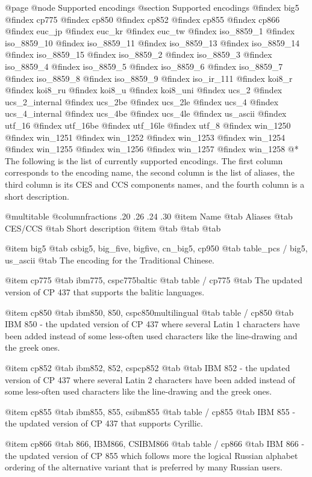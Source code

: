 @page
@node Supported encodings
@section Supported encodings
@findex big5
@findex cp775
@findex cp850
@findex cp852
@findex cp855
@findex cp866
@findex euc_jp
@findex euc_kr
@findex euc_tw
@findex iso_8859_1
@findex iso_8859_10
@findex iso_8859_11
@findex iso_8859_13
@findex iso_8859_14
@findex iso_8859_15
@findex iso_8859_2
@findex iso_8859_3
@findex iso_8859_4
@findex iso_8859_5
@findex iso_8859_6
@findex iso_8859_7
@findex iso_8859_8
@findex iso_8859_9
@findex iso_ir_111
@findex koi8_r
@findex koi8_ru
@findex koi8_u
@findex koi8_uni
@findex ucs_2
@findex ucs_2_internal
@findex ucs_2be
@findex ucs_2le
@findex ucs_4
@findex ucs_4_internal
@findex ucs_4be
@findex ucs_4le
@findex us_ascii
@findex utf_16
@findex utf_16be
@findex utf_16le
@findex utf_8
@findex win_1250
@findex win_1251
@findex win_1252
@findex win_1253
@findex win_1254
@findex win_1255
@findex win_1256
@findex win_1257
@findex win_1258
@*
The following is the list of currently supported encodings. The first column
corresponds to the encoding name, the second column is the list of aliases,
the third column is its CES and CCS components names, and the fourth column
is a short description.

@multitable @columnfractions .20 .26 .24 .30
@item
Name
@tab
Aliases
@tab
CES/CCS
@tab
Short description
@item
@tab
@tab
@tab


@item
big5
@tab
csbig5, big_five, bigfive, cn_big5, cp950
@tab
table_pcs / big5, us_ascii 
@tab
The encoding for the Traditional Chinese.


@item
cp775
@tab
ibm775, cspc775baltic
@tab
table / cp775
@tab
The updated version of CP 437 that supports the balitic languages.


@item
cp850
@tab
ibm850, 850, cspc850multilingual
@tab
table / cp850
@tab
IBM 850 - the updated version of CP 437 where several Latin 1 characters have been
added instead of some less-often used characters like the line-drawing
and the greek ones.


@item
cp852
@tab
ibm852, 852, cspcp852
@tab
@tab
IBM 852 - the updated version of CP 437 where several Latin 2 characters have been added
instead of some less-often used characters like the line-drawing and the greek ones.


@item
cp855
@tab
ibm855, 855, csibm855
@tab
table / cp855
@tab
IBM 855 - the updated version of CP 437 that supports Cyrillic.


@item
cp866
@tab
866, IBM866, CSIBM866
@tab
table / cp866
@tab
IBM 866 - the updated version of CP 855 which follows more the logical Russian alphabet 
ordering of the alternative variant that is preferred by many Russian users.


